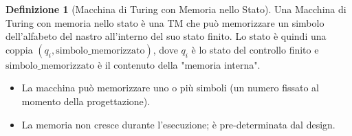 \documentclass[a4paper]{article}
\theoremstyle{definition} %
\newtheorem{definition}{Definizione}
\begin{document}
\begin{definition}[Macchina di Turing con Memoria nello Stato]
Una Macchina di Turing con memoria nello stato è una TM che può memorizzare un simbolo dell'alfabeto del nastro all'interno del suo stato finito. Lo stato è quindi una coppia $(q_i, \text{simbolo\_memorizzato})$, dove $q_i$ è lo stato del controllo finito e $\text{simbolo\_memorizzato}$ è il contenuto della "memoria interna".
\begin{itemize}
    \item La macchina può memorizzare uno o più simboli (un numero fissato al momento della progettazione).
    \item La memoria non cresce durante l'esecuzione; è pre-determinata dal design.
\end{itemize}
\end{definition}
\end{document}
